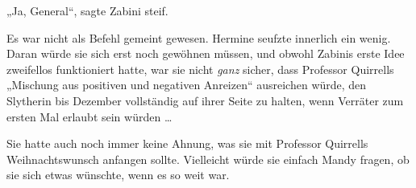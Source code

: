 „Ja, General“, sagte Zabini steif.

Es war nicht als Befehl gemeint gewesen. Hermine seufzte innerlich ein wenig. Daran würde sie sich erst noch gewöhnen müssen, und obwohl Zabinis erste Idee zweifellos funktioniert hatte, war sie nicht \emph{ganz} sicher, dass Professor Quirrells „Mischung aus positiven und negativen Anreizen“ ausreichen würde, den Slytherin bis Dezember vollständig auf ihrer Seite zu halten, wenn Verräter zum ersten Mal erlaubt sein würden …

Sie hatte auch noch immer keine Ahnung, was sie mit Professor Quirrells Weihnachtswunsch anfangen sollte. Vielleicht würde sie einfach Mandy fragen, ob sie sich etwas wünschte, wenn es so weit war.